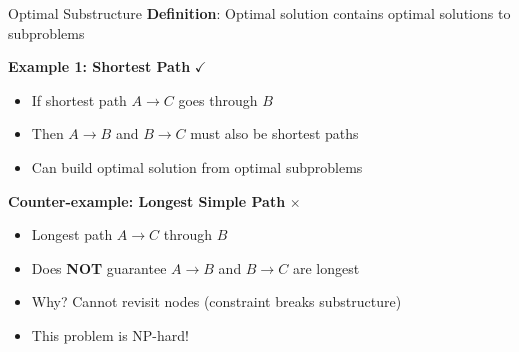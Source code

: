\documentclass[aspectratio=169]{beamer}
\begin{document}
\begin{frame}{Optimal Substructure}
  \textbf{Definition}: Optimal solution contains optimal solutions to subproblems

  \vspace{0.5cm}

  \textbf{Example 1: Shortest Path} $\checkmark$
  \begin{itemize}
    \item If shortest path $A \to C$ goes through $B$
    \item Then $A \to B$ and $B \to C$ must also be shortest paths
    \item Can build optimal solution from optimal subproblems
  \end{itemize}

  \vspace{0.5cm}

  \textbf{Counter-example: Longest Simple Path} $\times$
  \begin{itemize}
    \item Longest path $A \to C$ through $B$
    \item Does \textbf{NOT} guarantee $A \to B$ and $B \to C$ are longest
    \item Why? Cannot revisit nodes (constraint breaks substructure)
    \item This problem is NP-hard!
  \end{itemize}
\end{frame}
\end{document}

